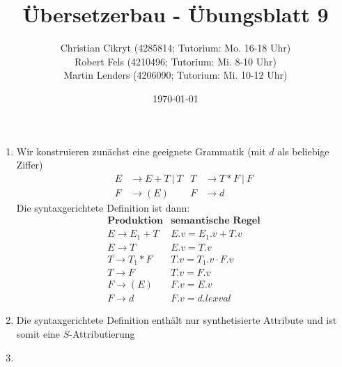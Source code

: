 \documentclass[a4paper,10pt]{scrartcl}
\title{Übersetzerbau - Übungsblatt 9}
\author{Christian Cikryt (4285814; Tutorium: Mo. 16-18 Uhr)\\
  Robert Fels (4210496; Tutorium: Mi. 8-10 Uhr)\\
  Martin Lenders (4206090; Tutorium: Mi. 10-12 Uhr)
  }
\date{\today}
\begin{document}
\maketitle

\section{}
\begin{enumerate}
\item   Wir konstruieren zunächst eine geeignete Grammatik (mit $d$ als beliebige Ziffer)
        \begin{align*}
            E &\to E + T\ |\ T &    T &\to T * F\ |\ F \\
            F &\to (E)         &    F &\to d
        \end{align*}
        Die syntaxgerichtete Definition ist dann:
        \[
            \begin{array}{l|l}
                \textbf{Produktion} & \textbf{semantische Regel}                \\\hline\hline
                E \to E_1 + T       & E.v = E_1.v + T.v                         \\
                E \to T             & E.v = T.v                                 \\
                T \to T_1 * F       & T.v = T_1.v \cdot F.v                     \\
                T \to F             & T.v = F.v                                 \\
                F \to (E)           & F.v = E.v                                 \\
                F \to d             & F.v = d.\textit{lexval}
            \end{array}
        \]
\item   Die syntaxgerichtete Definition enthält nur synthetisierte Attribute und ist somit eine $S$-Attributierung
\item   \hfill
        \begin{center}
\end{center}
\end{enumerate}
\end{document}
